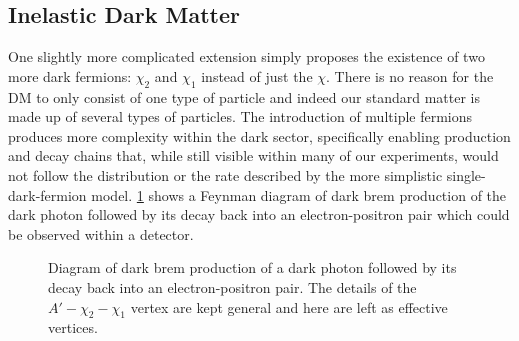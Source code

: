 \subsection{Inelastic Dark Matter}
\label{sec:theory-idm}

One slightly more complicated extension simply proposes the existence of two more dark fermions:
\(\chi_2\) and \(\chi_1\) instead of just the \(\chi\). There is no reason for the DM to only
consist of one type of particle and indeed our standard matter is made up of several types of
particles. The introduction of multiple fermions produces more complexity within the
dark sector, specifically enabling production and decay chains that, while still visible within
many of our experiments, would not follow the distribution or the rate described by the more
simplistic single-dark-fermion model. \cref{fig:dark-brem-idm-decay} shows a Feynman diagram of
dark brem production of the dark photon followed by its decay back into an electron-positron
pair which could be observed within a detector.

\begin{figure}
	\centering
	\caption{
		Diagram of dark brem production of a dark photon followed by its decay back into an electron-positron pair.
		The details of the $A'-\chi_2-\chi_1$ vertex are kept general and here are left as effective vertices.
	}
	\label{fig:dark-brem-idm-decay}
\end{figure}

